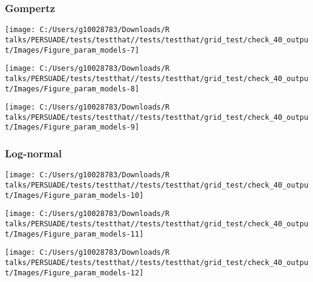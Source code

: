 \documentclass[
]{article}
\begin{document}
\clearpage

\subsubsection{Gompertz}\label{gompertz}

\begin{flushleft}\texttt{[image: C:/Users/g10028783/Downloads/R talks/PERSUADE/tests/testthat//tests/testthat/grid\_test/check\_40\_output/Images/Figure\_param\_models-7]} \end{flushleft}

\begin{flushleft}\texttt{[image: C:/Users/g10028783/Downloads/R talks/PERSUADE/tests/testthat//tests/testthat/grid\_test/check\_40\_output/Images/Figure\_param\_models-8]} \end{flushleft}

\begin{flushleft}\texttt{[image: C:/Users/g10028783/Downloads/R talks/PERSUADE/tests/testthat//tests/testthat/grid\_test/check\_40\_output/Images/Figure\_param\_models-9]} \end{flushleft}

\clearpage

\subsubsection{Log-normal}\label{log-normal}

\begin{flushleft}\texttt{[image: C:/Users/g10028783/Downloads/R talks/PERSUADE/tests/testthat//tests/testthat/grid\_test/check\_40\_output/Images/Figure\_param\_models-10]} \end{flushleft}

\begin{flushleft}\texttt{[image: C:/Users/g10028783/Downloads/R talks/PERSUADE/tests/testthat//tests/testthat/grid\_test/check\_40\_output/Images/Figure\_param\_models-11]} \end{flushleft}

\begin{flushleft}\texttt{[image: C:/Users/g10028783/Downloads/R talks/PERSUADE/tests/testthat//tests/testthat/grid\_test/check\_40\_output/Images/Figure\_param\_models-12]} \end{flushleft}

\clearpage
\end{document}
